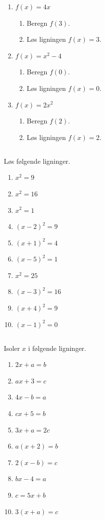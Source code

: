 \documentclass[10pt,a4paper,table]{article}
\begin{document}
\begin{enumerate}
    \item $f(x) = 4x$
    \begin{enumerate}
        \item Beregn $f(3)$.
        \item Løs ligningen $f(x)=3$.
    \end{enumerate}

    \item $f(x) = x^2 - 4$
    \begin{enumerate}
        \item Beregn $f(0)$.
        \item Løs ligningen $f(x)=0$.
    \end{enumerate}

    \item $f(x) = 2x^2$
    \begin{enumerate}
        \item Beregn $f(2)$.
        \item Løs ligningen $f(x)=2$.
    \end{enumerate}
\end{enumerate}

\subsection{}
Løs følgende ligninger.

\begin{enumerate}
  \item $x^2 = 9$
  \item $x^2 = 16$
  \item $x^2 = 1$
  \item $(x-2)^2 = 9$
  \item $(x+1)^2 = 4$
  \item $(x-5)^2 = 1$
  \item $x^2 = 25$
  \item $(x-3)^2 = 16$
  \item $(x+4)^2 = 9$
  \item $(x-1)^2 = 0$
\end{enumerate}

\subsection{}
Isoler $x$ i følgende ligninger.

\begin{enumerate}
  \item $2x + a = b$
  \item $ax + 3 = c$
  \item $4x - b = a$
  \item $cx + 5 = b$
  \item $3x + a = 2c$
  \item $a(x + 2) = b$
  \item $2(x - b) = c$
  \item $bx - 4 = a$
  \item $c = 5x + b$
  \item $3(x + a) = c$
\end{enumerate}
\end{document}
